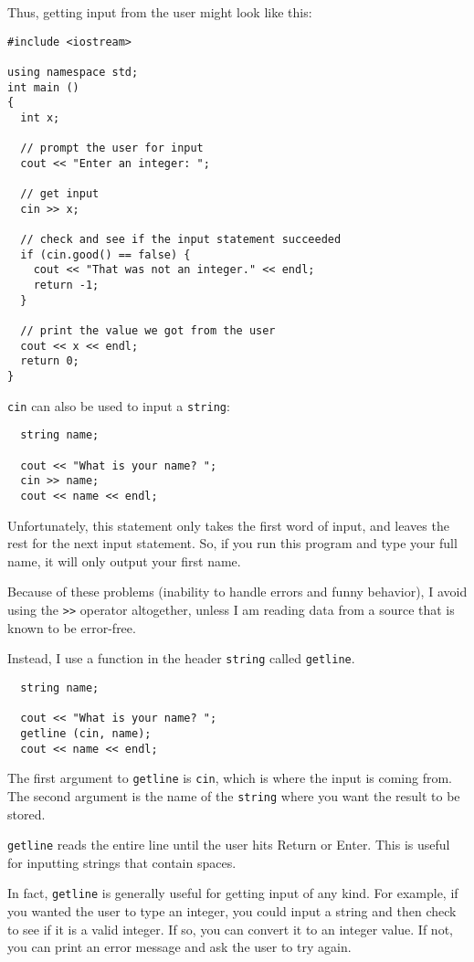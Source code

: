 Thus, getting input from the user might look like this:

\begin{verbatim}
#include <iostream>

using namespace std;
int main ()
{
  int x;

  // prompt the user for input
  cout << "Enter an integer: ";

  // get input
  cin >> x;

  // check and see if the input statement succeeded
  if (cin.good() == false) {
    cout << "That was not an integer." << endl;
    return -1;
  }

  // print the value we got from the user
  cout << x << endl;
  return 0;
}
\end{verbatim}
%
{\tt cin} can also be used to input a {\tt string}:

\begin{verbatim}
  string name;

  cout << "What is your name? ";
  cin >> name;
  cout << name << endl;
\end{verbatim}
%
Unfortunately, this statement only takes the first word of
input, and leaves the rest for the next input statement.
So, if you run this program and type your full name, it
will only output your first name.

Because of these problems (inability to handle errors and
funny behavior), I avoid using the {\tt >>} operator altogether,
unless I am reading data from a source that is known to be
error-free.

Instead, I use a function in the header {\tt string} called {\tt getline}.

\begin{verbatim}
  string name;

  cout << "What is your name? ";
  getline (cin, name);
  cout << name << endl;
\end{verbatim}
%
The first argument to {\tt getline} is {\tt cin}, which is
where the input is coming from.  The second argument is the
name of the {\tt string} where you want the result to be
stored.

{\tt getline} reads the entire line until the user hits
Return or Enter.  This is useful for inputting strings that
contain spaces.

In fact, {\tt getline} is generally useful for getting input
of any kind.  For example, if you wanted the user to type an
integer, you could input a string and then check to see if
it is a valid integer.  If so, you can convert it to an integer
value.  If not, you can print an error message and ask the user
to try again.

